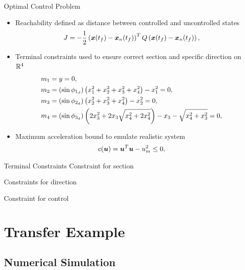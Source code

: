 \documentclass[11pt,professionalfonts]{beamer}
\begin{document}
\begin{frame}{Optimal Control Problem}
\begin{itemize}
    \item Reachability defined as distance between controlled and uncontrolled states
    \begin{align}\label{eq:cost}
        J = -\frac{1}{2} \left( \bm{x}(t_f) - \bm{x}_{n}(t_f)\right)^T 
        Q
        \left( \bm{x}(t_f) - \bm{x}_{n}(t_f)\right) ,
    \end{align}
    \item Terminal constraints used to ensure correct section and specific direction on \( \mathbb{R}^4 \)
        \begin{align}\label{eq:terminal_constraints}
            \begin{split}
                m_1 &= y = 0 , \\
                m_2 &= \left( \sin \phi_{1_{d}} \right) \left(  x_1^2 + x_2^2 + x_3^2 + x_4^2 \right) - x_1^2 = 0, \\
                m_3 &= \left( \sin \phi_{2_{d}} \right) \left(  x_2^2 + x_3^2 + x_4^2 \right) - x_2^2 = 0, \\
                m_4 &= \left( \sin \phi_{3_{d}} \right) \left(  2 x_3^2 + 2 x_3 \sqrt{x_4^2 + 2 x_4^2} \right) - x_3 - \sqrt{x_4^2 + x_3^2} = 0 ,
            \end{split}
        \end{align}
    \item Maximum acceleration bound to emulate realistic system
        \begin{align}\label{eq:control_constraint}
            c(\bm{u}) = \bm{u}^T \bm{u} - u_m^2 \leq 0 ,
        \end{align}
\end{itemize}

\end{frame}

\begin{frame}{Terminal Constraints}
Constraint for section

Constraints for direction

Constraint for control
\end{frame}

\section*{Transfer Example}
\subsection*{Numerical Simulation}
\end{document}

